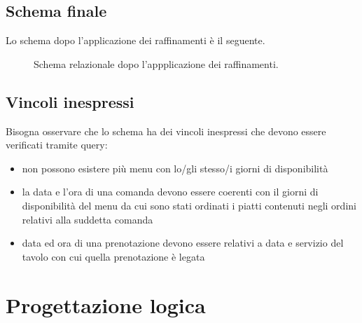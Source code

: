 \documentclass[a4paper,12pt]{report}
\begin{document}
\section{Schema finale}
%
Lo schema dopo l'applicazione dei raffinamenti è il seguente.
%
\begin{figure}[H]
    \centering
    \caption{Schema relazionale dopo l'appplicazione dei raffinamenti.}
\end{figure}
%
\section{Vincoli inespressi}
%
Bisogna osservare che lo schema ha dei vincoli inespressi che devono essere verificati tramite query:
\begin{itemize}
    \item non possono esistere più menu con lo/gli stesso/i giorni di disponibilità
    \item la data e l'ora di una comanda devono essere coerenti con il giorni di disponibilità del menu da cui sono stati ordinati i piatti contenuti negli ordini relativi alla suddetta comanda
    \item data ed ora di una prenotazione devono essere relativi a data e servizio del tavolo con cui quella prenotazione è legata
\end{itemize}
%
\chapter{Progettazione logica}
\end{document}
